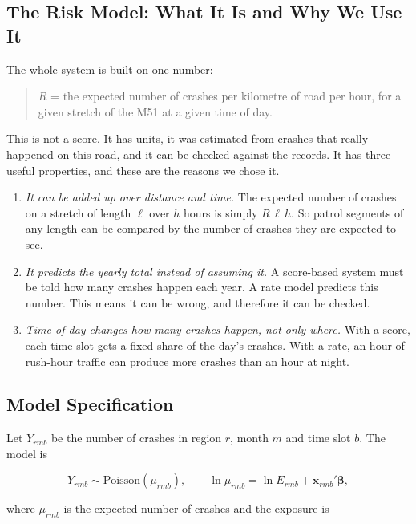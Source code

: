 \documentclass[11pt]{article}
\begin{document}
\subsection{The Risk Model: What It Is and Why We Use It}

The whole system is built on one number:

\begin{quote}
$R$ = the expected number of crashes per kilometre of road per hour, for a
given stretch of the M51 at a given time of day.
\end{quote}

This is not a score. It has units, it was estimated from crashes that really
happened on this road, and it can be checked against the records. It has three
useful properties, and these are the reasons we chose it.

\begin{enumerate}[leftmargin=*,itemsep=2pt]
\item \emph{It can be added up over distance and time.} The expected number of
crashes on a stretch of length $\ell$ over $h$ hours is simply $R\,\ell\,h$. So
patrol segments of any length can be compared by the number of crashes they
are expected to see.
\item \emph{It predicts the yearly total instead of assuming it.} A score-based
system must be told how many crashes happen each year. A rate model predicts
this number. This means it can be wrong, and therefore it can be checked.
\item \emph{Time of day changes how many crashes happen, not only where.} With a
score, each time slot gets a fixed share of the day's crashes. With a rate, an
hour of rush-hour traffic can produce more crashes than an hour at night.
\end{enumerate}

\subsection{Model Specification}

Let $Y_{rmb}$ be the number of crashes in region $r$, month $m$ and time slot
$b$. The model is

\begin{equation}
Y_{rmb}\sim\mathrm{Poisson}(\mu_{rmb}),\qquad
\ln\mu_{rmb}=\ln E_{rmb}+\mathbf{x}_{rmb}'\boldsymbol{\beta},
\label{eq:glm}
\end{equation}

where $\mu_{rmb}$ is the expected number of crashes and the exposure is
\end{document}
